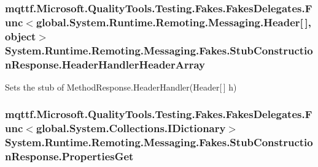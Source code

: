 \hypertarget{class_system_1_1_runtime_1_1_remoting_1_1_messaging_1_1_fakes_1_1_stub_construction_response_ab62847d453edf02ccad165c2de3f1c1d}{
\subsubsection[{Header\-Handler\-Header\-Array}]{\setlength{\rightskip}{0pt plus 5cm}mqttf.\-Microsoft.\-Quality\-Tools.\-Testing.\-Fakes.\-Fakes\-Delegates.\-Func$<$global.\-System.\-Runtime.\-Remoting.\-Messaging.\-Header\mbox{[}$\,$\mbox{]}, object$>$ System.\-Runtime.\-Remoting.\-Messaging.\-Fakes.\-Stub\-Construction\-Response.\-Header\-Handler\-Header\-Array}}\label{class_system_1_1_runtime_1_1_remoting_1_1_messaging_1_1_fakes_1_1_stub_construction_response_ab62847d453edf02ccad165c2de3f1c1d}


Sets the stub of Method\-Response.\-Header\-Handler(\-Header\mbox{[}$\,$\mbox{]} h)

\hypertarget{class_system_1_1_runtime_1_1_remoting_1_1_messaging_1_1_fakes_1_1_stub_construction_response_aedb82288ca97852ed4c63ef812519ffc}{
\subsubsection[{Properties\-Get}]{\setlength{\rightskip}{0pt plus 5cm}mqttf.\-Microsoft.\-Quality\-Tools.\-Testing.\-Fakes.\-Fakes\-Delegates.\-Func$<$global.\-System.\-Collections.\-I\-Dictionary$>$ System.\-Runtime.\-Remoting.\-Messaging.\-Fakes.\-Stub\-Construction\-Response.\-Properties\-Get}}\label{class_system_1_1_runtime_1_1_remoting_1_1_messaging_1_1_fakes_1_1_stub_construction_response_aedb82288ca97852ed4c63ef812519ffc}


